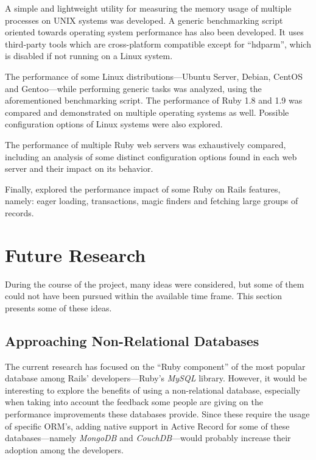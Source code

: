 A simple and lightweight utility for measuring the memory usage of multiple processes on UNIX systems was developed. A generic benchmarking script oriented towards operating system performance has also been developed. It uses third-party tools which are cross-platform compatible except for ``hdparm'', which is disabled if not running on a Linux system.

The performance of some Linux distributions---Ubuntu Server, Debian, CentOS and Gentoo---while performing generic tasks was analyzed, using the aforementioned benchmarking script. The performance of Ruby 1.8 and 1.9 was compared and demonstrated on multiple operating systems as well. Possible configuration options of Linux systems were also explored.

The performance of multiple Ruby web servers was exhaustively compared, including an analysis of some distinct configuration options found in each web server and their impact on its behavior.

Finally, explored the performance impact of some Ruby on Rails features, namely: eager loading, transactions, magic finders and fetching large groups of records.

\section{Future Research}
During the course of the project, many ideas were considered, but some of them could not have been pursued within the available time frame. This section presents some of these ideas.

\subsection{Approaching Non-Relational Databases}
The current research has focused on the ``Ruby component'' of the most popular database among Rails' developers---Ruby's \textit{MySQL} library. However, it would be interesting to explore the benefits of using a non-relational database, especially when taking into account the feedback some people are giving on the performance improvements these databases provide. Since these require the usage of specific ORM's, adding native support in Active Record for some of these databases---namely \textit{MongoDB} and \textit{CouchDB}---would probably increase their adoption among the developers.

